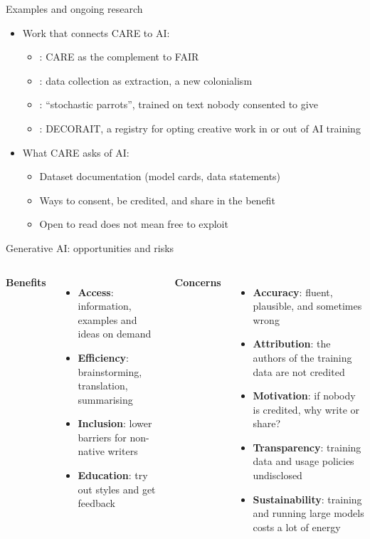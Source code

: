 \documentclass[aspectratio=169]{beamer}
\begin{document}
\begin{frame}{Examples and ongoing research}
\begin{itemize}
  \item Work that connects CARE to AI:
    \begin{itemize}
      \item \citet{CARE2020}: CARE as the complement to FAIR
      \item \citet{couldry2019datacolonialism}: data collection as extraction, a new colonialism
      \item \citet{bender2021stochastic}: ``stochastic parrots'', trained on text nobody consented to give
      \item \citet{decoraait2023registry}: DECORAIT, a registry for opting creative work in or out of AI training
    \end{itemize}
  \item What CARE asks of AI:
    \begin{itemize}
      \item Dataset documentation (model cards, data statements)
      \item Ways to consent, be credited, and share in the benefit
      \item Open to read does not mean free to exploit
    \end{itemize}
\end{itemize}
\end{frame}

\begin{frame}{Generative AI: opportunities and risks}
\begin{columns}[T]
\textbf{Benefits}
\begin{itemize}
  \item \textbf{Access}: information, examples and ideas on demand
  \item \textbf{Efficiency}: brainstorming, translation, summarising
  \item \textbf{Inclusion}: lower barriers for non-native writers
  \item \textbf{Education}: try out styles and get feedback
\end{itemize}

\textbf{Concerns}
\begin{itemize}
  \item \textbf{Accuracy}: fluent, plausible, and sometimes wrong
  \item \textbf{Attribution}: the authors of the training data are not credited
  \item \textbf{Motivation}: if nobody is credited, why write or share?
  \item \textbf{Transparency}: training data and usage policies undisclosed
  \item \textbf{Sustainability}: training and running large models costs a lot of energy
\end{itemize}
\end{columns}
\end{frame}
\end{document}

